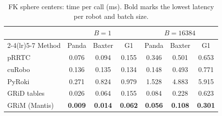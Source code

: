 \begin{table}[h]
  \centering
  \caption{FK sphere centers: time per call (ms). Bold marks the lowest latency per robot and batch size.}
  \label{tab:app:fk}
  \footnotesize
  \setlength{\tabcolsep}{3pt}
  \begin{tabular}{lcccccc}
    \toprule
    & \multicolumn{3}{c}{$B = 1$} & \multicolumn{3}{c}{$B = 16384$} \\
    \cmidrule(lr){2-4}\cmidrule(lr){5-7}
    Method & Panda & Baxter & G1 & Panda & Baxter & G1 \\
    \midrule
    pRRTC & 0.076 & 0.094 & 0.155 & 0.346 & 0.501 & 0.653 \\
    cuRobo & 0.136 & 0.135 & 0.134 & 0.148 & 0.493 & 0.771 \\
    PyRoki & 0.271 & 0.824 & 0.979 & 1.528 & 4.883 & 5.915 \\
    GRiD tables & 0.026 & 0.064 & 0.155 & 0.084 & 0.228 & 0.623 \\
    GRiM (Mantis) & \textbf{0.009} & \textbf{0.014} & \textbf{0.062} & \textbf{0.056} & \textbf{0.108} & \textbf{0.301} \\
    \bottomrule
  \end{tabular}
\end{table}
